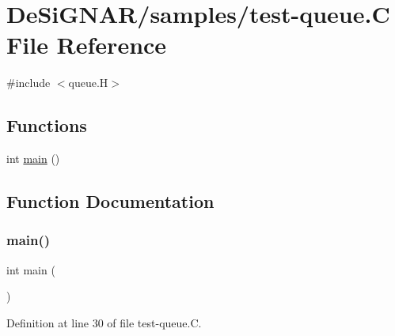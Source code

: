 \hypertarget{test-queue_8_c}{}\section{De\+Si\+G\+N\+A\+R/samples/test-\/queue.C File Reference}
\label{test-queue_8_c}
{\ttfamily \#include $<$queue.\+H$>$}\newline
\subsection*{Functions}
\begin{DoxyCompactItemize}
\item 
int \hyperlink{test-queue_8_c_ae66f6b31b5ad750f1fe042a706a4e3d4}{main} ()
\end{DoxyCompactItemize}


\subsection{Function Documentation}
\mbox{\label{test-queue_8_c_ae66f6b31b5ad750f1fe042a706a4e3d4}} 
\subsubsection{\texorpdfstring{main()}{main()}}
{\footnotesize\ttfamily int main (\begin{DoxyParamCaption}{ }\end{DoxyParamCaption})}



Definition at line 30 of file test-\/queue.\+C.

